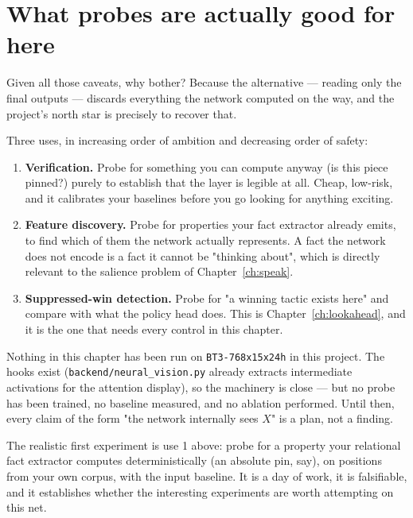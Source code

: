 \section{What probes are actually good for here}

Given all those caveats, why bother? Because the alternative --- reading only the final
outputs --- discards everything the network computed on the way, and the project's north star
is precisely to recover that.

Three uses, in increasing order of ambition and decreasing order of safety:

\begin{enumerate}
\item \textbf{Verification.} Probe for something you can compute anyway (is this piece
  pinned?) purely to establish that the layer is legible at all. Cheap, low-risk, and it
  calibrates your baselines before you go looking for anything exciting.
\item \textbf{Feature discovery.} Probe for properties your fact extractor already emits, to
  find which of them the network actually represents. A fact the network does not encode is a
  fact it cannot be "thinking about", which is directly relevant to the salience problem of
  Chapter~\ref{ch:speak}.
\item \textbf{Suppressed-win detection.} Probe for "a winning tactic exists here" and compare
  with what the policy head does. This is Chapter~\ref{ch:lookahead}, and it is the one that
  needs every control in this chapter.
\end{enumerate}

\begin{hypothesis}
Nothing in this chapter has been run on \texttt{BT3-768x15x24h} in this project. The hooks
exist (\texttt{backend/neural\_vision.py} already extracts intermediate activations for the
attention display), so the machinery is close --- but no probe has been trained, no baseline
measured, and no ablation performed. Until then, every claim of the form "the network
internally sees $X$" is a plan, not a finding.
\end{hypothesis}

\begin{repobox}[title={in this repository}]
The realistic first experiment is use 1 above: probe for a property your relational fact
extractor computes deterministically (an absolute pin, say), on positions from your own
corpus, with the input baseline. It is a day of work, it is falsifiable, and it establishes
whether the interesting experiments are worth attempting on this net.
\end{repobox}


